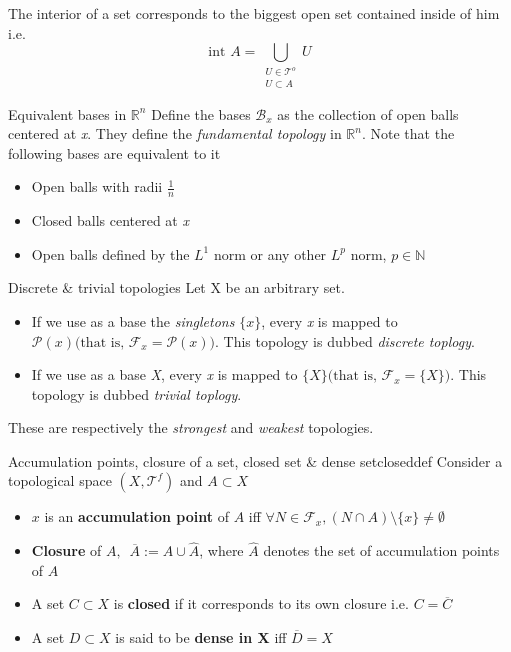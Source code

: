 \begin{myremark}
	The interior of a set corresponds to the biggest open set contained inside of him i.e.
	$$\textrm{int } A = \bigcup_{\substack{U\in \mathcal{T}^o \\ U \subset A}} U$$
	\iffalse
	\begin{myproof}
		\begin{itemize}
			\item $\supset : \enspace \forall U, U \subset A \implies \textrm{int } U = U \subset \textrm{int } A$
			\item $\subset : \enspace \textrm{int } A $ is itself open.
		\end{itemize}
	\end{myproof}
	\fi
\end{myremark}
\begin{myeg}{Equivalent bases in $\mathbb{R}^n$}
	Define the bases $\mathcal{B}_x$ as the collection of open balls centered at \textit{x}. They define the \textit{fundamental topology} in $\mathbb{R}^n$. Note that the following bases are equivalent to it
	\begin{itemize}
		\item Open balls with radii $\frac{1}{n}$
		\item Closed balls centered at \textit{x}
		\item Open balls defined by the $L^1$ norm or any other $L^p$ norm, $p\in \mathbb{N}$
	\end{itemize}
\end{myeg}
\begin{myeg}{Discrete \& trivial topologies}
	Let X be an arbitrary set.
	\begin{itemize}
		\item If we use as a base the \textit{singletons} $\{x\}$, every \textit{x} is mapped to $\mathcal{P}(x) \big( \textrm{that is, }\mathcal{F}_x = \mathcal{P}(x) \big)$. This topology is dubbed \textit{discrete toplogy}.
		\item If we use as a base \textit{X}, every \textit{x} is mapped to $\{X\} \big( \textrm{that is, }\mathcal{F}_x = \{X\}\big)$. This topology is dubbed \textit{trivial toplogy}.
	\end{itemize}
	These are respectively the \textit{strongest} and \textit{weakest} topologies.
\end{myeg}
\begin{mydef}{Accumulation points, closure of a set, closed set \& dense set}{closeddef}
	Consider a topological space $(X, \mathcal{T}^f)$ and $A\subset X$
	\begin{itemize}
		\item $x$ is an \textbf{accumulation point} of $A$ iff $\forall N \in  \mathcal{F}_x, (N\cap A)\setminus \{x\} \neq \emptyset{} $
		\item \textbf{Closure} of $A, \enspace \overline{A} := A \cup \hat{A}$, where $\hat{A}$ denotes the set of accumulation points of $A$
		\item A set $C \subset X$ is \textbf{closed} if it corresponds to its own closure i.e. $C = \overline{C}$
		\item A set $D \subset X$ is said to be \textbf{dense in X} iff
		$ \overline{D} = X $
	\end{itemize}
\end{mydef}
